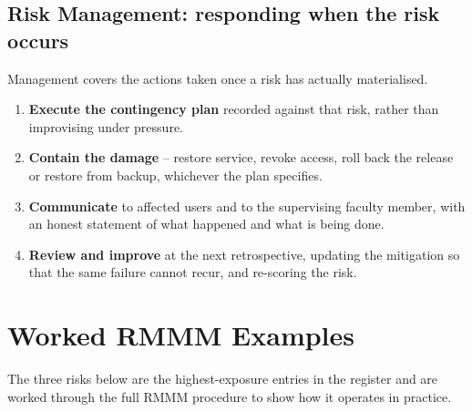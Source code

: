 \documentclass[11pt,a4paper]{report}
\begin{document}
\subsection{Risk Management: responding when the risk occurs}

Management covers the actions taken once a risk has actually materialised.

\begin{enumerate}
  \item \textbf{Execute the contingency plan} recorded against that risk, rather
  than improvising under pressure.
  \item \textbf{Contain the damage} -- restore service, revoke access, roll back
  the release or restore from backup, whichever the plan specifies.
  \item \textbf{Communicate} to affected users and to the supervising faculty
  member, with an honest statement of what happened and what is being done.
  \item \textbf{Review and improve} at the next retrospective, updating the
  mitigation so that the same failure cannot recur, and re-scoring the risk.
\end{enumerate}

\section{Worked RMMM Examples}

The three risks below are the highest-exposure entries in the register and are
worked through the full RMMM procedure to show how it operates in practice.
\end{document}
